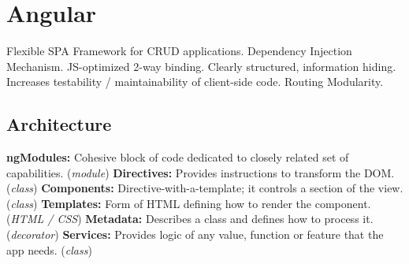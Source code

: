 
\section{Angular}
Flexible SPA Framework for CRUD applications.
Dependency Injection Mechanism.
JS-optimized 2-way binding.
Clearly structured, information hiding.
Increases testability / maintainability of client-side code.
Routing Modularity.


\subsection{Architecture}
\textbf{ngModules:} Cohesive block of code dedicated to closely related set of capabilities. (\textit{module})
\textbf{Directives:} Provides instructions to transform the DOM. (\textit{class})
\textbf{Components:} Directive-with-a-template; it controls a section of the view. (\textit{class})
\textbf{Templates:} Form of HTML defining how to render the component. (\textit{HTML / CSS})
\textbf{Metadata:} Describes a class and defines how to process it. (\textit{decorator})
\textbf{Services:} Provides logic of any value, function or feature that the app needs. (\textit{class})

